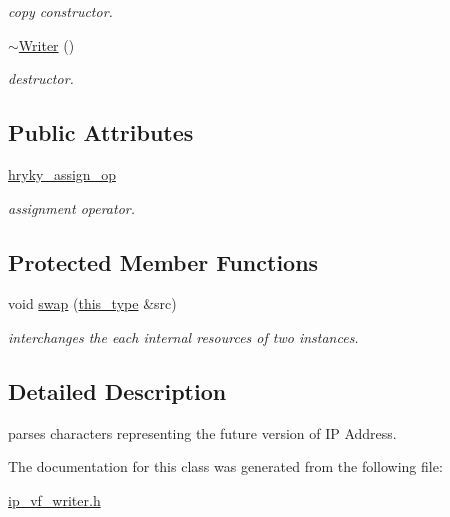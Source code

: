 \begin{DoxyCompactItemize}
\begin{DoxyCompactList}\small\item\em copy constructor. \end{DoxyCompactList}\item 
\hypertarget{classhryky_1_1ip_1_1vf_1_1_writer_a29fba5b27652ced68e4fbd2b1a590ade}{\hyperlink{classhryky_1_1ip_1_1vf_1_1_writer_a29fba5b27652ced68e4fbd2b1a590ade}{$\sim$\-Writer} ()}\label{classhryky_1_1ip_1_1vf_1_1_writer_a29fba5b27652ced68e4fbd2b1a590ade}

\begin{DoxyCompactList}\small\item\em destructor. \end{DoxyCompactList}\end{DoxyCompactItemize}
\subsection*{Public Attributes}
\begin{DoxyCompactItemize}
\item 
\hypertarget{classhryky_1_1ip_1_1vf_1_1_writer_a9958f410f1ffaab992525f2adf3d49d9}{\hyperlink{classhryky_1_1ip_1_1vf_1_1_writer_a9958f410f1ffaab992525f2adf3d49d9}{hryky\-\_\-assign\-\_\-op}}\label{classhryky_1_1ip_1_1vf_1_1_writer_a9958f410f1ffaab992525f2adf3d49d9}

\begin{DoxyCompactList}\small\item\em assignment operator. \end{DoxyCompactList}\end{DoxyCompactItemize}
\subsection*{Protected Member Functions}
\begin{DoxyCompactItemize}
\item 
\hypertarget{classhryky_1_1ip_1_1vf_1_1_writer_aea22ccdeb7de466ab0d4da9ca55fdacd}{void \hyperlink{classhryky_1_1ip_1_1vf_1_1_writer_aea22ccdeb7de466ab0d4da9ca55fdacd}{swap} (\hyperlink{classhryky_1_1ip_1_1vf_1_1_writer_aa50e41a90ce5f2371a4fecc1982da520}{this\-\_\-type} \&src)}\label{classhryky_1_1ip_1_1vf_1_1_writer_aea22ccdeb7de466ab0d4da9ca55fdacd}

\begin{DoxyCompactList}\small\item\em interchanges the each internal resources of two instances. \end{DoxyCompactList}\end{DoxyCompactItemize}


\subsection{Detailed Description}
parses characters representing the future version of I\-P Address. 

The documentation for this class was generated from the following file\-:\begin{DoxyCompactItemize}
\item 
\hyperlink{ip__vf__writer_8h}{ip\-\_\-vf\-\_\-writer.\-h}\end{DoxyCompactItemize}
